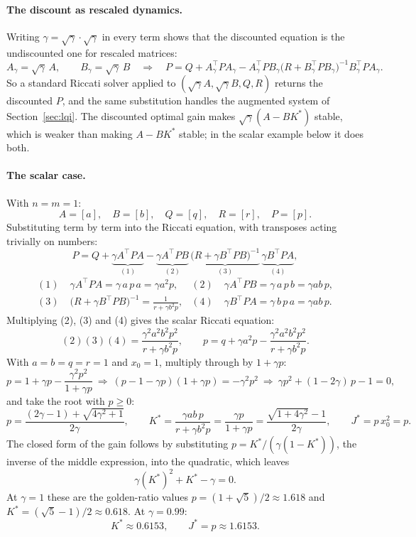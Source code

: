 \documentclass[11pt]{article}
\begin{document}
\paragraph{The discount as rescaled dynamics.} Writing $\gamma = \sqrt{\gamma}\cdot\sqrt{\gamma}$ in
every term shows that the discounted equation is the undiscounted one for rescaled matrices:
\[
  A_\gamma = \sqrt{\gamma}\, A, \qquad B_\gamma = \sqrt{\gamma}\, B
  \quad\Longrightarrow\quad
  P = Q + A_\gamma^\top P A_\gamma - A_\gamma^\top P B_\gamma \big(R + B_\gamma^\top P B_\gamma\big)^{-1}
  B_\gamma^\top P A_\gamma .
\]
So a standard Riccati solver applied to $(\sqrt{\gamma} A, \sqrt{\gamma} B, Q, R)$ returns the
discounted $P$, and the same substitution handles the augmented system of Section~\ref{sec:lqi}. The
discounted optimal gain makes $\sqrt{\gamma}(A - BK^*)$ stable, which is weaker than making $A - BK^*$
stable; in the scalar example below it does both.

\paragraph{The scalar case.} With $n = m = 1$:
\[
  A = [a], \quad B = [b], \quad Q = [q], \quad R = [r], \quad P = [p].
\]
Substituting term by term into the Riccati equation, with transposes acting trivially on numbers:
\[
  P = Q + \underbrace{\gamma A^\top P A}_{(1)} - \underbrace{\gamma A^\top P B}_{(2)}\,
  \underbrace{\big(R + \gamma B^\top P B\big)^{-1}}_{(3)}\, \underbrace{\gamma B^\top P A}_{(4)},
\]
\begin{align*}
  (1)\;& \gamma A^\top P A = \gamma\, a\, p\, a = \gamma a^2 p, &
  (2)\;& \gamma A^\top P B = \gamma\, a\, p\, b = \gamma a b\, p, \\
  (3)\;& \big(R + \gamma B^\top P B\big)^{-1} = \frac{1}{r + \gamma b^2 p}, &
  (4)\;& \gamma B^\top P A = \gamma\, b\, p\, a = \gamma a b\, p .
\end{align*}
Multiplying (2), (3) and (4) gives the scalar Riccati equation:
\[
  (2)(3)(4) = \frac{\gamma^2 a^2 b^2 p^2}{r + \gamma b^2 p},
  \qquad
  p = q + \gamma a^2 p - \frac{\gamma^2 a^2 b^2 p^2}{r + \gamma b^2 p} .
\]
With $a = b = q = r = 1$ and $x_0 = 1$, multiply through by $1 + \gamma p$:
\[
  p = 1 + \gamma p - \frac{\gamma^2 p^2}{1 + \gamma p}
  \ \Longrightarrow\ (p - 1 - \gamma p)(1 + \gamma p) = -\gamma^2 p^2
  \ \Longrightarrow\ \gamma p^2 + (1 - 2\gamma)\, p - 1 = 0 ,
\]
and take the root with $p \ge 0$:
\[
  p = \frac{(2\gamma - 1) + \sqrt{4\gamma^2 + 1}}{2\gamma}, \qquad
  K^* = \frac{\gamma a b\, p}{r + \gamma b^2 p} = \frac{\gamma p}{1 + \gamma p}
  = \frac{\sqrt{1 + 4\gamma^2} - 1}{2\gamma}, \qquad
  J^* = p\, x_0^2 = p .
\]
The closed form of the gain follows by substituting $p = K^*/(\gamma(1 - K^*))$, the inverse of the
middle expression, into the quadratic, which leaves
\[
  \gamma (K^*)^2 + K^* - \gamma = 0 .
\]
At $\gamma = 1$ these are the golden-ratio values $p = (1 + \sqrt{5})/2 \approx 1.618$ and
$K^* = (\sqrt{5} - 1)/2 \approx 0.618$. At $\gamma = 0.99$:
\[
  K^* \approx 0.6153, \qquad J^* = p \approx 1.6153 .
\]
\end{document}
